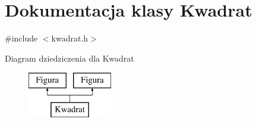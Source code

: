 \hypertarget{classKwadrat}{\section{Dokumentacja klasy Kwadrat}
\label{classKwadrat}
}


{\ttfamily \#include $<$kwadrat.\-h$>$}

Diagram dziedziczenia dla Kwadrat\begin{figure}[H]
\begin{center}
\leavevmode
\includegraphics[height=2.000000cm]{d4/d2c/classKwadrat}
\end{center}
\end{figure}

